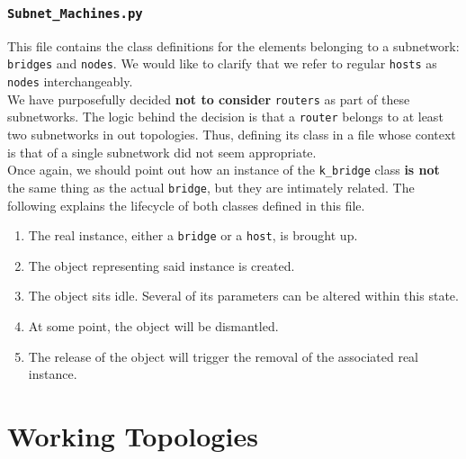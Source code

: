             \subsubsection{\texttt{Subnet\_Machines.py}}
                This file contains the class definitions for the elements belonging to a subnetwork: \texttt{bridges} and \texttt{nodes}. We would like to clarify that we refer to regular \texttt{hosts} as \texttt{nodes} interchangeably.\\

                We have purposefully decided \textbf{not to consider} \texttt{routers} as part of these subnetworks. The logic behind the decision is that a \texttt{router} belongs to at least two subnetworks in out topologies. Thus, defining its class in a file whose context is that of a single subnetwork did not seem appropriate.\\

                Once again, we should point out how an instance of the \texttt{k\_bridge} class \textbf{is not} the same thing as the actual \texttt{bridge}, but they are intimately related. The following explains the lifecycle of both classes defined in this file.\\

                \begin{enumerate}
                    \item The real instance, either a \texttt{bridge} or a \texttt{host}, is brought up.
                    \item The object representing said instance is created.
                    \item The object sits idle. Several of its parameters can be altered within this state.
                    \item At some point, the object will be dismantled.
                    \item The release of the object will trigger the removal of the associated real instance.
                \end{enumerate}

    \section{Working Topologies}
